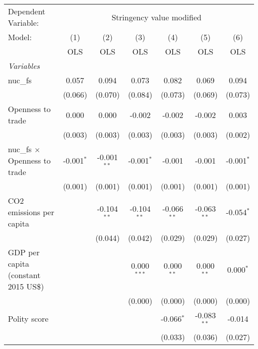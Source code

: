 
\begingroup
\centering
\begin{tabular}{lcccccc}
   \toprule
   Dependent Variable: & \multicolumn{6}{c}{Stringency value modified}\\
   Model:                               & (1)          & (2)           & (3)           & (4)           & (5)           & (6)\\  
                                        &  OLS         & OLS           & OLS           & OLS           & OLS           & OLS\\  
   \midrule
   \emph{Variables}\\
   nuc\_fs                              & 0.057        & 0.094         & 0.073         & 0.082         & 0.069         & 0.094\\   
                                        & (0.066)      & (0.070)       & (0.084)       & (0.073)       & (0.069)       & (0.073)\\   
   Openness to trade                    & 0.000        & 0.000         & -0.002        & -0.002        & -0.002        & 0.003\\   
                                        & (0.003)      & (0.003)       & (0.003)       & (0.003)       & (0.003)       & (0.002)\\   
   nuc\_fs $\times$ Openness to trade   & -0.001$^{*}$ & -0.001$^{**}$ & -0.001$^{*}$  & -0.001        & -0.001        & -0.001$^{*}$\\   
                                        & (0.001)      & (0.001)       & (0.001)       & (0.001)       & (0.001)       & (0.001)\\   
   CO2 emissions per capita             &              & -0.104$^{**}$ & -0.104$^{**}$ & -0.066$^{**}$ & -0.063$^{**}$ & -0.054$^{*}$\\   
                                        &              & (0.044)       & (0.042)       & (0.029)       & (0.029)       & (0.027)\\   
   GDP per capita (constant 2015 US\$)  &              &               & 0.000$^{***}$ & 0.000$^{**}$  & 0.000$^{**}$  & 0.000$^{*}$\\   
                                        &              &               & (0.000)       & (0.000)       & (0.000)       & (0.000)\\   
   Polity score                         &              &               &               & -0.066$^{*}$  & -0.083$^{**}$ & -0.014\\   
                                        &              &               &               & (0.033)       & (0.036)       & (0.027)\\   

\end{tabular}
